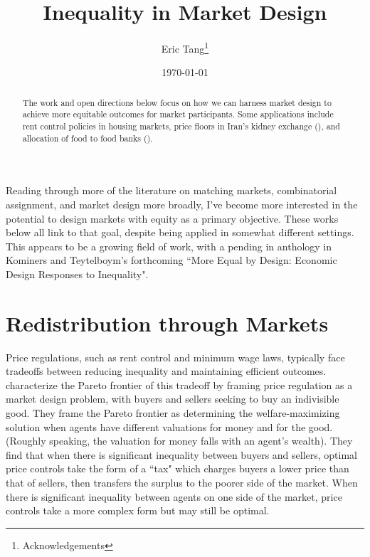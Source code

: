 \documentclass[JEL]{AEA}
\begin{document}
\title{Inequality in Market Design}
\author{Eric Tang\thanks{%
Acknowledgements}}
\date{\today}
\JEL{}
\Keywords{}

\begin{abstract}
The work and open directions below focus on how we can harness market design to achieve more equitable outcomes for market participants. Some applications include rent control policies in housing markets, price floors in Iran's kidney exchange (\cite{dworczak-2020}), and allocation of food to food banks (\cite{prendergast-2017}).
\end{abstract}

\maketitle

Reading through more of the literature on matching markets, combinatorial assignment, and market design more broadly, I've become more interested in the potential to design markets with equity as a primary objective. These works below all link to that goal, despite being applied in somewhat different settings. This appears to be a growing field of work, with a pending in anthology in Kominers and Teytelboym's forthcoming ``More Equal by Design: Economic Design Responses to Inequality".

\section{Redistribution through Markets}

Price regulations, such as rent control and minimum wage laws, typically face tradeoffs between reducing inequality and maintaining efficient outcomes. \cite{dworczak-2020} characterize the Pareto frontier of this tradeoff by framing price regulation as a market design problem, with buyers and sellers seeking to buy an indivisible good. They frame the Pareto frontier as determining the welfare-maximizing solution when agents have different valuations for money and for the good. (Roughly speaking, the valuation for money falls with an agent's wealth). They find that when there is significant inequality between buyers and sellers, optimal price controls take the form of a ``tax" which charges buyers a lower price than that of sellers, then transfers the surplus to the poorer side of the market. When there is significant inequality between agents on one side of the market, price controls take a more complex form but may still be optimal.
\end{document}
